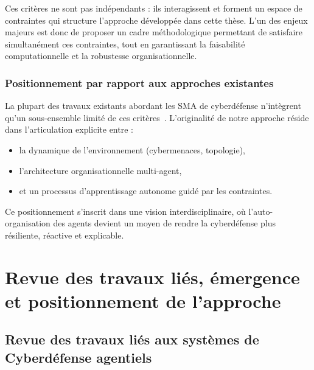 \documentclass[ twoside,openright,titlepage,numbers=noenddot,headinclude,%
                footinclude=true,cleardoublepage=empty,abstractoff, %
                BCOR=5mm,paper=a4,fontsize=11pt,%
                french,american,%
                ]{scrreprt}
\begin{document}
Ces critères ne sont pas indépendants : ils interagissent et forment un espace de contraintes qui structure l'approche développée dans cette thèse. L'un des enjeux majeurs est donc de proposer un cadre méthodologique permettant de satisfaire simultanément ces contraintes, tout en garantissant la faisabilité computationnelle et la robustesse organisationnelle.

\subsection*{Positionnement par rapport aux approches existantes}

La plupart des travaux existants abordant les SMA de cyberdéfense n'intègrent qu'un sous-ensemble limité de ces critères~\cite{Smejkal2021cyberdefense, Kim2020rlcyberdefense}. L'originalité de notre approche réside dans l'articulation explicite entre :
\begin{itemize}
    \item la dynamique de l'environnement (cybermenaces, topologie),
    \item l'architecture organisationnelle multi-agent,
    \item et un processus d'apprentissage autonome guidé par les contraintes.
\end{itemize}

Ce positionnement s'inscrit dans une vision interdisciplinaire, où l'auto-organisation des agents devient un moyen de rendre la cyberdéfense plus résiliente, réactive et explicable.





\chapter{Revue des travaux liés, émergence et positionnement de l'approche}

\section{Revue des travaux liés aux systèmes de Cyberdéfense agentiels}\label{sec:revue-cyberdef-agent}
\end{document}
